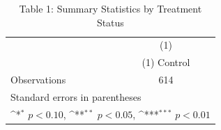 \begin{table}[htbp]\centering
\def\sym#1{\ifmmode^{#1}\else\(^{#1}\)\fi}
\caption{Table 1: Summary Statistics by Treatment Status}
\begin{tabular}{l*{1}{c}}
\toprule
                    &\multicolumn{1}{c}{(1)}\\
                    &\multicolumn{1}{c}{(1) Control}\\
\midrule
\midrule
Observations        &         614         \\
\bottomrule
\multicolumn{2}{l}{\footnotesize Standard errors in parentheses}\\
\multicolumn{2}{l}{\footnotesize \sym{*} \(p<0.10\), \sym{**} \(p<0.05\), \sym{***} \(p<0.01\)}\\
\end{tabular}
\end{table}
